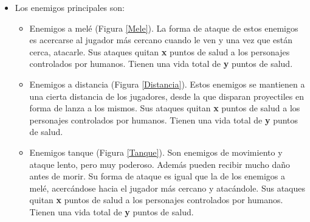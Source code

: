 \begin{itemize}
\item Los enemigos principales son:
\begin{itemize}
\item Enemigos a melé (Figura \ref{Mele}). La forma de ataque de estos enemigos es acercarse al jugador más cercano cuando le ven y una vez que están cerca, atacarle. Sus ataques quitan \textbf{x}  puntos de salud a los personajes controlados por humanos. Tienen una vida total de \textbf{y}  puntos de salud.
\item Enemigos a distancia (Figura \ref{Distancia}). Estos enemigos se mantienen a una cierta distancia de los jugadores, desde la que disparan proyectiles en forma de lanza a los mismos. Sus  ataques quitan \textbf{x}  puntos de salud a los personajes controlados por humanos. Tienen una vida total de \textbf{y}  puntos de salud.
\item Enemigos tanque (Figura \ref{Tanque}). Son enemigos de movimiento y ataque lento, pero muy poderoso. Además pueden recibir mucho daño antes de morir. Su forma de ataque es igual que la de los enemigos a melé, acercándose hacia el jugador más cercano y atacándole. Sus ataques quitan \textbf{x}  puntos de salud a los personajes controlados por humanos. Tienen una vida total de \textbf{y}  puntos de salud.
\end{itemize}


\end{itemize}
